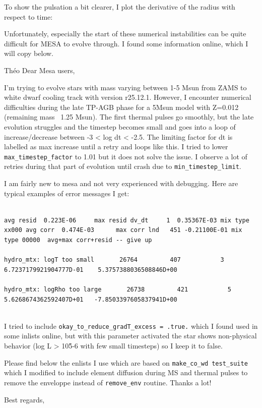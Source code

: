 \documentclass[a4paper,10pt]{article}
\begin{document}
To show the pulsation a bit clearer, I plot the derivative of the radius with respect to time:
\begin{figure}[ht]
    \centering
\end{figure}

Unfortunately, especially the start of these numerical instabilities can be quite difficult for MESA to evolve through. I found some information online, which I will copy below.

\nextpage

\begin{minipage}{1.55\textwidth}
\begin{shadequote}{Théo}
Dear Mesa users,

I’m trying to evolve stars with mass varying between 1-5 Msun from ZAMS to white dwarf cooling track with version r25.12.1. However, I encounter numerical difficulties during the late TP-AGB phase for a 5Msun model with Z=0.012 (remaining mass ~1.25 Msun). The first thermal pulses go smoothly, but the late evolution struggles and the timestep becomes small and goes into a loop of increase/decrease between -3 < log dt <  -2.5. The limiting factor for dt is labelled as max increase until a retry and loops like this. I tried to lower \lstinline[style=output, breaklines=true]|max_timestep_factor| to 1.01 but it does not solve the issue. I observe a lot of retries during that part of evolution until crash due to \lstinline[style=output, breaklines=true]|min_timestep_limit|.  

I am fairly new to mesa and not very experienced with debugging. Here are typical examples of error messages I get:

\begin{verbatim}

avg resid  0.223E-06     max resid dv_dt     1  0.35367E-03 mix type xx000 avg corr  0.474E-03      max corr lnd   451 -0.21100E-01 mix type 00000  avg+max corr+resid -- give up

hydro_mtx: logT too small       26764         407           3    6.7237179921904777D-01    5.3757388036508846D+00

hydro_mtx: logRho too large       26738         421           5    5.6268674362592407D+01   -7.8503397605837941D+00


\end{verbatim}


I tried to include \lstinline[style=output, breaklines=true]|okay_to_reduce_gradT_excess = .true.| which I found used in some inlists online, but with this parameter activated the star shows non-physical behavior (log L > 10\^5-6 with few small timesteps) so I keep it to false.

Please find below the enlists I use which are based on \lstinline[style=output, breaklines=true]|make_co_wd test_suite| which I modified to include element diffusion during MS and thermal pulses to remove the enveloppe instead of \lstinline[style=output, breaklines=true]|remove_env| routine. Thanks a lot!

Best regards,
\end{shadequote}
\end{minipage}
\end{document}
